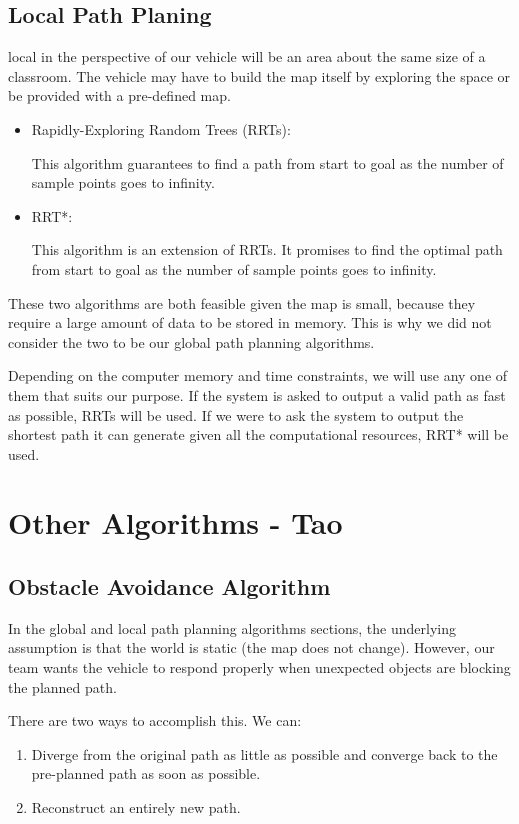 \documentclass[compsoc,draftclsnofoot,onecolumn,10pt]{IEEEtran}
\begin{document}
\subsection{Local Path Planing}
local in the perspective of our vehicle will be an area about the same size of a 
classroom. The vehicle may have to build the map itself by exploring the space or 
be provided with a pre-defined map.\par
\begin{itemize}
\item Rapidly-Exploring Random Trees (RRTs):\par
This algorithm guarantees to find a path from start to goal as the number of 
sample points goes to infinity.
\item RRT*:\par
This algorithm is an extension of RRTs. It promises to find the optimal path from 
start to goal as the number of sample points goes to infinity. 
\end{itemize}
These two algorithms are both feasible given the map is small, because they require 
a large amount of data to be stored in memory. This is why we did not consider the 
two to be our global path planning algorithms.\par

Depending on the computer memory and time constraints, we will use any one of them 
that suits our purpose. If the system is asked to output a valid path as fast as 
possible, RRTs will be used. If we were to ask the system to output the shortest path 
it can generate given all the computational resources, RRT* will be used.\par

\section{Other Algorithms - Tao}
\subsection{Obstacle Avoidance Algorithm}
In the global and local path planning algorithms sections, the underlying assumption 
is that the world is static (the map does not change). However, our team wants the 
vehicle to respond properly when unexpected objects are blocking the planned path.\par 

There are two ways to accomplish this. We can:\par
\begin{enumerate}
\item Diverge from the original path as little as possible and converge back to 
the pre-planned path as soon as possible.
\item Reconstruct an entirely new path.
\end{enumerate}
\end{document}
